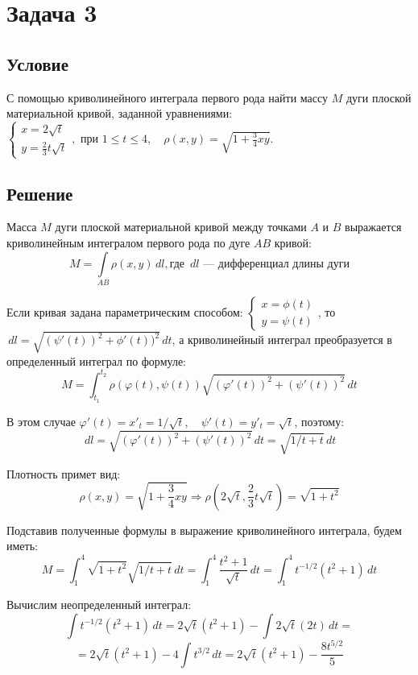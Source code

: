 \documentclass[12pt]{article}
\begin{document}
	\section*{Задача 3}	
	\subsection*{Условие}
	
	С помощью криволинейного интеграла первого рода	найти массу $M$ дуги плоской материальной кривой, заданной уравнениями:			 
		$\begin{cases}
			x = 2\sqrt{t}\\
			y=\frac{2}{3}t\sqrt{t}
		\end{cases},\text{ при }  1 \leq t \leq 4 ,\quad \rho(x,y)=\sqrt{1+\frac{3}{4}xy} .$
	
	
	\subsection*{Решение}
	
	Масса $M$ дуги плоской материальной кривой между точками $A$ и $B$ выражается криволинейным интегралом первого рода по дуге $AB$ кривой:
	$$ M = \int \limits_{AB} \rho (x,y ) \,dl,\text{где $\,dl$ --- дифференциал длины дуги}$$
	
	Если кривая задана параметрическим способом:
	$\begin{cases}
		x = \phi (t)\\
		y = \psi (t)
	\end{cases}$, то $ \,dl =\sqrt{(\psi'(t))^2+\phi'(t))^2}\,dt $, а криволинейный интеграл преобразуется в определенный интеграл по формуле:
	$$ M = \int_{t_1}^{t_2}\rho (\varphi(t),\psi(t))\sqrt{(\varphi'(t))^2+(\psi'(t))^2}\,dt$$ 
	
	В этом случае $ \varphi'(t)= x'_t= 1/\sqrt{t},\quad \psi'(t)= y'_t= \sqrt{t} $, поэтому:
	$$ \,dl=\sqrt{(\varphi'(t))^2+(\psi'(t))^2}\,dt=\sqrt{1/t+t}\,dt $$
	
	Плотность примет вид:	
	$$ \rho(x,y)=\sqrt{1+\frac{3}{4}xy} \Rightarrow \rho(2\sqrt{t}, \frac{2}{3}t\sqrt{t})=\sqrt{1+t^2}$$
	
	Подставив полученные формулы в выражение криволинейного	интеграла, будем иметь:
	$$ M = \int_{1}^{4}\sqrt{1+t^2}\sqrt{1/t+t}\,dt = \int_{1}^{4}\frac{t^2+1}{\sqrt{t}}\,dt  = \int_{1}^{4}t^{-1/2}(t^2+1)\,dt $$ 
	
	Вычислим неопределенный интеграл:
	$$\int t^{-1/2}(t^2+1)\,dt = 2\sqrt{t}(t^2+1) - \int 2\sqrt{t}(2t)\,dt = $$ 
	$$= 2\sqrt{t}(t^2+1) - 4 \int t^{3/2} \,dt = 2\sqrt{t}(t^2+1) -  \frac{8t^{5/2}}{5} $$ 
	
\end{document}
